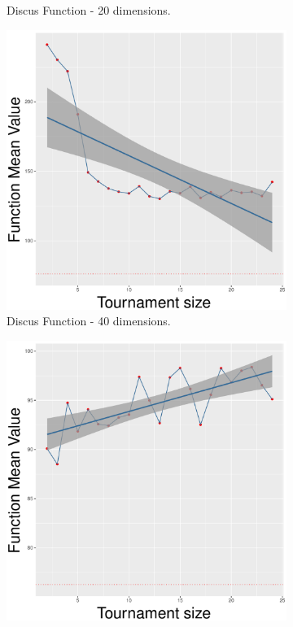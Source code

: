 \begin{figure}[!t]
\begin{subfigure}[b]{0.33\textwidth}
		\caption{Discus Function - 20 dimensions.}
	\end{subfigure}
	\begin{subfigure}[b]{0.33\textwidth}
		\centering
		\includegraphics[width=\textwidth]{img/SBX-40D/unimodal_sbx_11_dim_40.pdf}
		\caption{Discus Function - 40 dimensions.}
	\end{subfigure}
	\caption{SBX crossover - ($\lambda, \lambda$) scheme.}
	\label{sbx-11-a}
	\begin{subfigure}[b]{0.33\textwidth}
		\centering
		\includegraphics[width=\textwidth]{img/uniform-10D/unimodal_uniform_11_dim_10.pdf}

\end{subfigure}
\end{figure}
